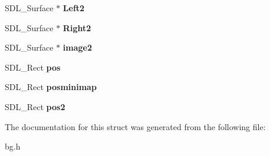 \begin{DoxyCompactItemize}
\item 
S\+D\+L\+\_\+\+Surface $\ast$ {\bfseries Left2}\hypertarget{structMinimapCursor_af811bfe0b12a2469a53ae46758ed62d5}{}\label{structMinimapCursor_af811bfe0b12a2469a53ae46758ed62d5}

\item 
S\+D\+L\+\_\+\+Surface $\ast$ {\bfseries Right2}\hypertarget{structMinimapCursor_ac65a25239d4567ce9b16033f866a8645}{}\label{structMinimapCursor_ac65a25239d4567ce9b16033f866a8645}

\item 
S\+D\+L\+\_\+\+Surface $\ast$ {\bfseries image2}\hypertarget{structMinimapCursor_a79ab395808920a30dbaec5931d19892d}{}\label{structMinimapCursor_a79ab395808920a30dbaec5931d19892d}

\item 
S\+D\+L\+\_\+\+Rect {\bfseries pos}\hypertarget{structMinimapCursor_a83c9454346ef2a6d763c390707c60a3f}{}\label{structMinimapCursor_a83c9454346ef2a6d763c390707c60a3f}

\item 
S\+D\+L\+\_\+\+Rect {\bfseries posminimap}\hypertarget{structMinimapCursor_a02100af041f1daa831118e22261b9d51}{}\label{structMinimapCursor_a02100af041f1daa831118e22261b9d51}

\item 
S\+D\+L\+\_\+\+Rect {\bfseries pos2}\hypertarget{structMinimapCursor_affab14ecb11aa6ffbc6eb1622124de8b}{}\label{structMinimapCursor_affab14ecb11aa6ffbc6eb1622124de8b}

\end{DoxyCompactItemize}


The documentation for this struct was generated from the following file\+:\begin{DoxyCompactItemize}
\item 
bg.\+h\end{DoxyCompactItemize}
